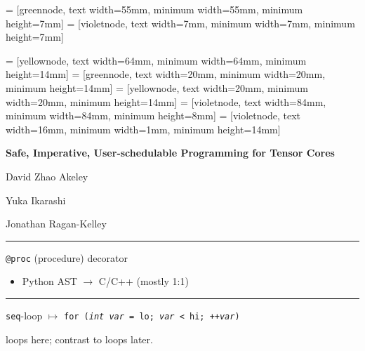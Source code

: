  = [greennode, text width=55mm, minimum width=55mm, minimum height=7mm]
 = [violetnode, text width=7mm, minimum width=7mm, minimum height=7mm]

 = [yellownode, text width=64mm, minimum width=64mm, minimum height=14mm]
 = [greennode, text width=20mm, minimum width=20mm, minimum height=14mm]
 = [yellownode, text width=20mm, minimum width=20mm, minimum height=14mm]
 = [violetnode, text width=84mm, minimum width=84mm, minimum height=8mm]
 = [violetnode, text width=16mm, minimum width=1mm, minimum height=14mm]
\newcommand{\consumerBox}[1]{{\color{greenBoxFg}\colorbox{greenBoxBg}{#1}}}
\newcommand{\producerBox}[1]{{\color{yellowBoxFg}\colorbox{yellowBoxBg}{#1}}}


\textbf{\hfill \Large Safe, Imperative, User-schedulable Programming for Tensor Cores}

{\LARGE

\vfill

David Zhao Akeley

Yuka Ikarashi

Jonathan Ragan-Kelley

\hfill {}}


\newpage
{}

{\large

}

\vspace{3mm}
\hrule

{\LARGE
\texttt{@proc} (procedure) decorator
\begin{itemize}
  \item Python AST $\to$ C/C++ (mostly 1:1)
\end{itemize}

}

\newpage
{}

{\large

}

\vspace{3mm}
\hrule

{\LARGE
\texttt{seq}-loop $\mapsto$ \texttt{for (\textit{int var} = lo; \textit{var} < hi; ++\textit{var})}

 loops here; contrast to  loops later.

}

